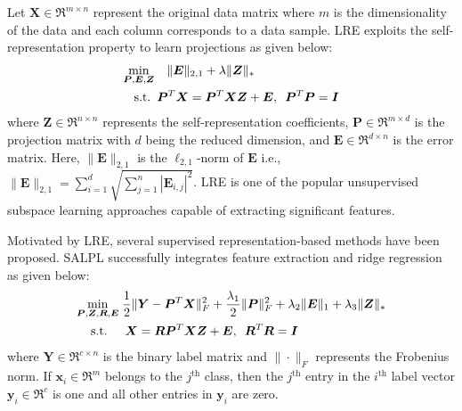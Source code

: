Let $\bm{X} \in \Re^{m \times n}$ represent the original data matrix where $m$ is the dimensionality of the data and each column corresponds to a data sample. LRE exploits the self-representation property to learn projections as given below:
%
\begin{align}
    \begin{split}
        \label{eq: LRE}
        & \underset{\bm{P}, \bm{E},\bm{Z}}{\min} \quad \| \bm{E} \|_{2,1} + \lambda \| \bm{Z} \|_{*} \\
        & \hspace{0.3cm} \text{s.t.} \enskip \bm{P}^{T}\bm{X} = \bm{P}^{T}\bm{X}\bm{Z} + \bm{E}, \enskip \bm{P}^{T}\bm{P} =\bm{I}
    \end{split}
\end{align}
%
where $\bm{Z} \in \Re^{n \times n}$ represents the self-representation coefficients, $\bm{P} \in \Re^{m \times d}$ is the projection matrix with $d$ being the reduced dimension, and $\bm{E} \in \Re^{d \times n}$ is the error matrix. Here, $\|\bm{E}\|_{2,1}$ is the $\ell_{2,1}$-norm of $\bm{E}$ i.e., $\|\bm{E}\|_{2,1} = \sum_{i=1}^{d} \sqrt{\sum_{j=1}^{n} |\bm{E}_{i,j}|^{2}}$. LRE is one of the popular unsupervised subspace learning approaches capable of extracting significant features. 

Motivated by LRE, several supervised representation-based methods have been proposed. SALPL successfully integrates feature extraction and ridge regression as given below:
%
\begin{align}
    \begin{split}
        \label{eq: SALPL}
       & \underset{\bm{P}, \bm{Z}, \bm{R}, \bm{E}}{\min} \; \frac{1}{2} \| \bm{Y} - \bm{P}^{T}\bm{X} \|_{F}^{2} + \frac{\lambda_{1}}{2} \| \bm{P} \|_{F}^{2} + \lambda_{2} \| \bm{E} \|_{1} + \lambda_{3} \| \bm{Z} \|_{*} \\
        & \hspace{0.4cm} \text{s.t.} \hspace{0.5cm} \bm{X} = \bm{R}\bm{P}^{T} \bm{X} \bm{Z} + \bm{E}, \enskip \bm{R}^{T}\bm{R} = \bm{I}
    \end{split}
\end{align}
%
where $\bm{Y} \in \Re^{c \times n}$ is the binary label matrix and $\|\cdot\|_{F}$ represents the Frobenius norm. If $\bm{x}_i \in \Re^{m}$ belongs to the $j^\text{{th}}$ class, then the $j^{\text{th}}$ entry in the $i^{\text{th}}$ label vector $\bm{y}_{i} \in \Re^{c}$ is one and all other entries in $\bm{y}_{i}$ are zero.

